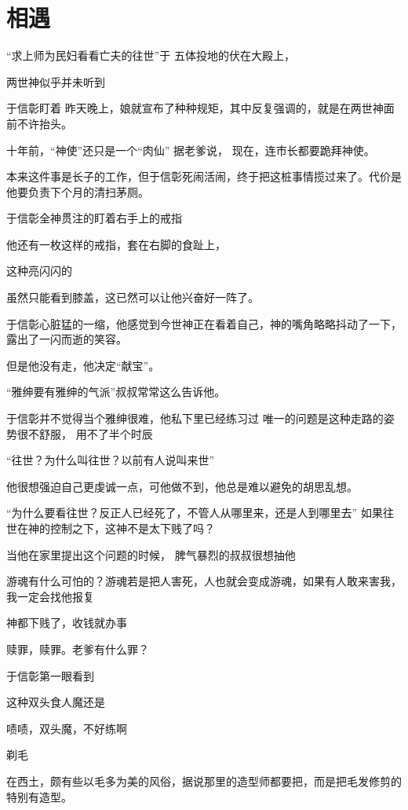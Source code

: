 \chapter{相遇}

“求上师为民妇看看亡夫的往世”于 五体投地的伏在大殿上，

两世神似乎并未听到

于信彰盯着
昨天晚上，娘就宣布了种种规矩，其中反复强调的，就是在两世神面前不许抬头。

十年前，“神使”还只是一个“肉仙”
据老爹说，
现在，连市长都要跪拜神使。



本来这件事是长子的工作，但于信彰死闹活闹，终于把这桩事情揽过来了。代价是他要负责下个月的清扫茅厕。


于信彰全神贯注的盯着右手上的戒指

他还有一枚这样的戒指，套在右脚的食趾上，

这种亮闪闪的

虽然只能看到膝盖，这已然可以让他兴奋好一阵了。

于信彰心脏猛的一缩，他感觉到今世神正在看着自己，神的嘴角略略抖动了一下，露出了一闪而逝的笑容。

但是他没有走，他决定“献宝”。

“雅绅要有雅绅的气派”叔叔常常这么告诉他。

于信彰并不觉得当个雅绅很难，他私下里已经练习过
唯一的问题是这种走路的姿势很不舒服，
用不了半个时辰


“往世？为什么叫往世？以前有人说叫来世”

他很想强迫自己更虔诚一点，可他做不到，他总是难以避免的胡思乱想。

“为什么要看往世？反正人已经死了，不管人从哪里来，还是人到哪里去”
如果往世在神的控制之下，这神不是太下贱了吗？

当他在家里提出这个问题的时候，
脾气暴烈的叔叔很想抽他

游魂有什么可怕的？游魂若是把人害死，人也就会变成游魂，如果有人敢来害我，我一定会找他报复

神都下贱了，收钱就办事



赎罪，赎罪。老爹有什么罪？

于信彰第一眼看到

这种双头食人魔还是

啧啧，双头魔，不好练啊

剃毛

在西土，颇有些以毛多为美的风俗，据说那里的造型师都要把，而是把毛发修剪的特别有造型。

